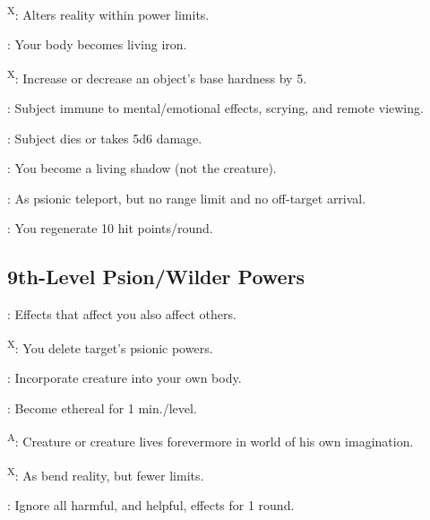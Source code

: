 \textsuperscript{X}: Alters reality within power limits.

: Your body becomes living iron.

\textsuperscript{X}: Increase or decrease an object’s base hardness by 5.

: Subject immune to mental/emotional effects, scrying, and remote viewing.

: Subject dies or takes 5d6 damage.

: You become a living shadow (not the creature).

: As psionic teleport, but no range limit and no off-target arrival.

: You regenerate 10 hit points/round.




\subsection{9th-Level Psion/Wilder Powers}

: Effects that affect you also affect others.

\textsuperscript{X}: You delete target’s psionic powers.

: Incorporate creature into your own body.

: Become ethereal for 1 min./level.

\textsuperscript{A}: Creature or creature lives forevermore in world of his own imagination.

\textsuperscript{X}: As bend reality, but fewer limits.

: Ignore all harmful, and helpful, effects for 1 round.